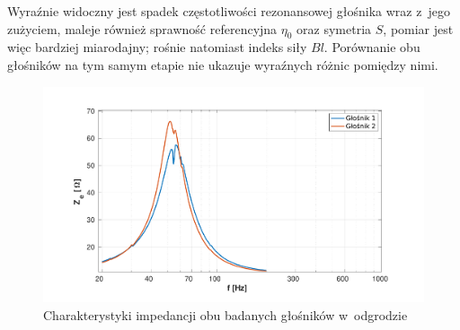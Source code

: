 \documentclass[12pt]{oska}
\begin{document}
		Wyraźnie widoczny jest spadek częstotliwości rezonansowej głośnika wraz z~jego zużyciem, maleje również sprawność referencyjna $\eta_0$ oraz symetria $S$, pomiar jest więc bardziej miarodajny; rośnie natomiast indeks siły $Bl$. Porównanie obu głośników na tym samym etapie nie ukazuje wyraźnych różnic pomiędzy nimi.
		
		\begin{figure}[!ht]
			\centering
			\includegraphics[width=.8\textwidth,trim={2cm .5cm 2cm 1cm},clip]{porownanie_glosnikow.pdf}
			\caption{Charakterystyki impedancji obu badanych głośników w~odgrodzie}
			\label{r:2glosniki}
		\end{figure}
		
\end{document}
